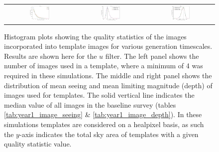 \documentclass[preprintm,linenumbers]{aastex631}
\begin{document}
		
		\begin{figure}[h]
			\centering
			\begin{tabular}{c c c}
				
				\includegraphics[width=0.3\textwidth]{results/histograms_templates_tscale/hist_first_year_one_snap_v4_0_10yrs_db_noDD_noTwi_doALLTemplateMetrics_reduceNTemplate_u_noDD_noTwi.pdf} &
				\includegraphics[width=0.3\textwidth]{results/histograms_templates_tscale/hist_first_year_one_snap_v4_0_10yrs_db_noDD_noTwi_doALLTemplateMetrics_reduceSeeingTemplate_u_noDD_noTwi.pdf} &
				\includegraphics[width=0.3\textwidth]{results/histograms_templates_tscale/hist_first_year_one_snap_v4_0_10yrs_db_noDD_noTwi_doALLTemplateMetrics_reduceDepthTemplate_u_noDD_noTwi.pdf} \\
				
			\end{tabular}
			\caption{
				Histogram plots showing the quality statistics of the images incorporated into template images for various generation timescales.
				Results are shown here for the $u$ filter. 
				The left panel shows the number of images used in a template, where a minimum of 4 was required in these simulations. %
				The middle and right panel shows the distribution of mean seeing and mean limiting magnitude (depth) of images used for templates.
				The solid vertical line indicates the median value of all images in the baseline survey (tables \ref{tab:year1_image_seeing} \& \ref{tab:year1_image_depth}).
				In these simulations templates are considered on a healpixel basis, as such the $y$-axis indicates the total sky area of templates with a given quality statistic value. \label{appendixa:1}
			}
		\end{figure}
		
\end{document}
